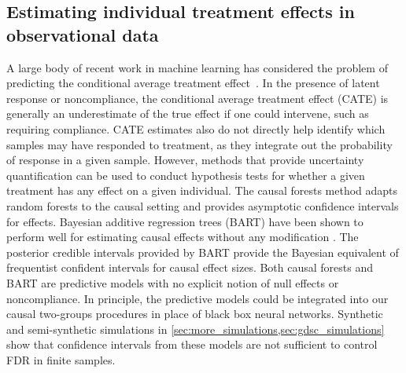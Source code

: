 \subsection{Estimating individual treatment effects in observational data}
\label{subsec:background:causal-effects}
A large body of recent work in machine learning has considered the problem of predicting the conditional average treatment effect~\cite[e.g.][]{shi:etal:2019:dragonnet,johansson:etal:gen-bounds-causal,bica:etal:2020:causal-gan,wang:etal:2024:cauusal-optimal-transport}. In the presence of latent response or noncompliance, the conditional average treatment effect (CATE) is generally an underestimate of the true effect if one could intervene, such as requiring compliance. CATE estimates also do not directly help identify which samples may have responded to treatment, as they integrate out the probability of response in a given sample. However, methods that provide uncertainty quantification can be used to conduct hypothesis tests for whether a given treatment has any effect on a given individual. The causal forests method \citep{wager:athey:2018:causal-forests} adapts random forests \citep{breiman:2001:random-forests} to the causal setting and provides asymptotic confidence intervals for effects. Bayesian additive regression trees (BART) \citep{chipman:etal:2010:bart} have been shown to perform well for estimating causal effects without any modification \citep{hill:etal:2011:causal-bart}. The posterior credible intervals provided by BART provide the Bayesian equivalent of frequentist confident intervals for causal effect sizes. Both causal forests and BART are predictive models with no explicit notion of null effects or noncompliance. In principle, the predictive models could be integrated into our causal two-groups procedures in place of black box neural networks. Synthetic and semi-synthetic simulations in \cref{sec:more_simulations,sec:gdsc_simulations} show that confidence intervals from these models are not sufficient to control FDR in finite samples.



